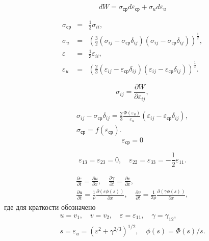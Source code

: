 \documentclass[specialist, subf, href, colorlinks=true, 14pt, final]{disser}
\theoremstyle{definition}
\begin{document}
\[
	dW = \sigma_{\text{ср}}d\varepsilon_{\text{ср}} + \sigma_{u}d\varepsilon_u
\]
\addtocounter{equation}{1}
	\begin{equation}\label{eq:236}
		\begin{array}{lll}
			\sigma_{\text{ср}} &=& \displaystyle \frac{1}{3} \sigma_{ii},\\
			\sigma_u &=& \left(\displaystyle \frac{3}{2} (\sigma_{ij} - \sigma_{\text{ср}}\delta_{ij})(\sigma_{ij} - \sigma_{\text{ср}}\delta_{ij}) \right)^{\displaystyle \frac{1}{2}},\\
			\varepsilon_{} &=& \displaystyle \frac{1}{3} \varepsilon_{ii},\\
			\varepsilon_u &=& \left(\displaystyle  \frac{2}{3} (\varepsilon_{ij} - \varepsilon_{\text{ср}}\delta_{ij})(\varepsilon_{ij} - \varepsilon_{\text{ср}}\delta_{ij}) \right)^{\displaystyle \frac{1}{2}}.
		\end{array}
  	\tag{6}
	\end{equation}

\[ \sigma_{ij} = \frac{\partial W}{\partial \varepsilon_{ij}}, \]

\addtocounter{equation}{1}
	\begin{equation}\label{eq:237}
		\begin{array}{l}
			\sigma_{ij} - \sigma_{\text{ср}}\delta_{ij} =\displaystyle  \frac{2}{3} \frac{\Phi(\varepsilon_u)}{\varepsilon_u} (\varepsilon_{ij} - \varepsilon_{\text{ср}}\delta_{ij}), \\
			\sigma_{\text{ср}} = f(\varepsilon_{\text{ср}}).
		\end{array}
  	\tag{7}
	\end{equation}
\[ \varepsilon_{\text{ср}} = 0 \]
\addtocounter{equation}{1}
	\begin{equation}\label{eq:238}
	 \varepsilon_{13} = \varepsilon_{23} = 0, \quad \varepsilon_{22} = \varepsilon_{33} = - \frac{1}{2}\varepsilon_{11}. 
	\tag{8}
	\end{equation} 

\addtocounter{equation}{1}
	\begin{equation}\label{eq:239}
		\begin{array}{l}
			\displaystyle \frac{\partial \varepsilon}{\partial t} = \displaystyle \frac{\partial u}{\partial x}, \quad \displaystyle \frac{\partial \gamma}{\partial t} = \displaystyle \frac{\partial v}{\partial x}, \\
			\displaystyle \frac{\partial u}{\partial t} = \displaystyle \frac{1}{\rho} \frac{\partial (\varepsilon \phi(s))}{\partial x}, \quad \displaystyle \frac{\partial v}{\partial t} = \displaystyle \frac{1}{3 \rho} \frac{\partial (\gamma \phi(s))}{\partial x},
		\end{array}
  	\tag{9}
	\end{equation}
где для краткости обозначено 
\[ 
	\begin{array}{l}
		u = v_1, \quad v = v_2, \quad \varepsilon = \varepsilon_{11}, \quad \gamma = \gamma_{12}, \\
		s = \varepsilon_u = (\varepsilon^2 + \gamma^{2/3})^{1/2}, \quad \phi(s) = \Phi(s)/s.
	\end{array}
\]
\end{document}
